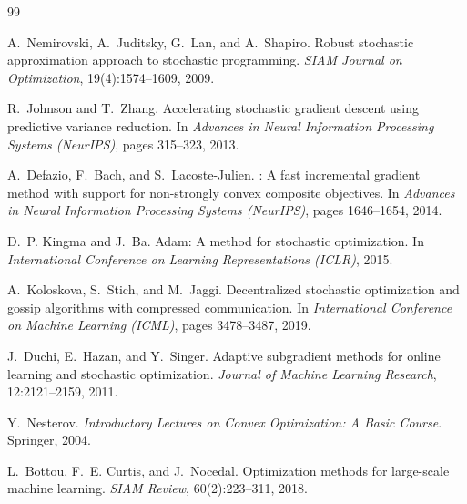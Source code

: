 \documentclass[12pt,a4paper]{report}
\begin{document}
\begin{thebibliography}{99}

A.~Nemirovski, A.~Juditsky, G.~Lan, and A.~Shapiro.
\newblock Robust stochastic approximation approach to stochastic programming.
\newblock \textit{SIAM Journal on Optimization}, 19(4):1574--1609, 2009.

R.~Johnson and T.~Zhang.
\newblock Accelerating stochastic gradient descent using predictive variance
  reduction.
\newblock In \textit{Advances in Neural Information Processing Systems (NeurIPS)},
  pages 315--323, 2013.

A.~Defazio, F.~Bach, and S.~Lacoste-Julien.
: A fast incremental gradient method with support for
  non-strongly convex composite objectives.
\newblock In \textit{Advances in Neural Information Processing Systems (NeurIPS)},
  pages 1646--1654, 2014.

D.~P. Kingma and J.~Ba.
\newblock Adam: A method for stochastic optimization.
\newblock In \textit{International Conference on Learning Representations
  (ICLR)}, 2015.

A.~Koloskova, S.~Stich, and M.~Jaggi.
\newblock Decentralized stochastic optimization and gossip algorithms with
  compressed communication.
\newblock In \textit{International Conference on Machine Learning (ICML)},
  pages 3478--3487, 2019.

J.~Duchi, E.~Hazan, and Y.~Singer.
\newblock Adaptive subgradient methods for online learning and stochastic
  optimization.
\newblock \textit{Journal of Machine Learning Research}, 12:2121--2159, 2011.

Y.~Nesterov.
\newblock \textit{Introductory Lectures on Convex Optimization: A Basic Course}.
\newblock Springer, 2004.

L.~Bottou, F.~E. Curtis, and J.~Nocedal.
\newblock Optimization methods for large-scale machine learning.
\newblock \textit{SIAM Review}, 60(2):223--311, 2018.

\end{thebibliography}
\end{document}
